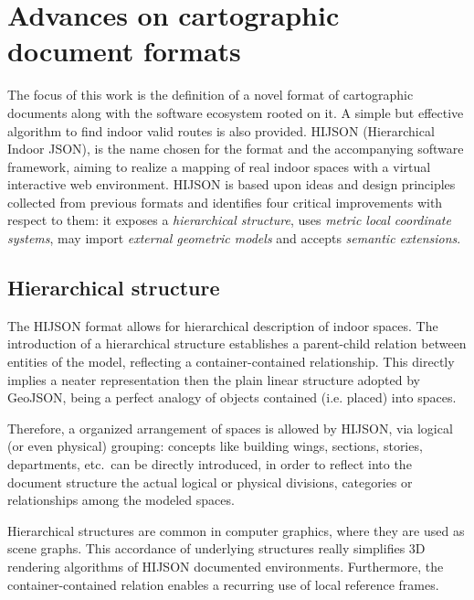 
\section{Advances on cartographic\\ document formats}\label{advances-on-cartographic-document-format}
\label{advances}

The focus of this work is the definition of a novel format of cartographic
documents along with the software ecosystem rooted on it. A simple but
effective algorithm to find indoor valid routes is also provided.  {HIJSON}
({H}ierarchical {I}ndoor {JSON}),  is the name chosen
for the format and the accompanying software framework, aiming to realize a
mapping of real indoor spaces with a virtual interactive web environment.
HIJSON is based upon ideas and design principles collected from previous
formats and identifies four critical improvements with respect to them: it
exposes a \emph{hierarchical structure}, uses \emph{metric local coordinate
systems}, may import \emph{external geometric models} and accepts \emph{semantic
extensions}. 

\subsection{Hierarchical structure}\label{hierarchical-structure}

The HIJSON format allows for hierarchical description of indoor spaces. The
introduction of a hierarchical structure establishes a parent-child relation
between entities of the model, reflecting a container-contained relationship.
This directly implies a neater representation then the plain linear structure
adopted by GeoJSON, being a perfect analogy of objects contained (i.e.
placed) into spaces.

Therefore, a  organized arrangement of spaces is allowed by HIJSON, via
logical (or even physical) grouping: concepts like building wings, sections,
stories, departments, etc.~can be directly introduced, in order to reflect
into the document structure the actual logical or physical divisions,
categories or relationships among the modeled spaces.

Hierarchical structures are common in computer graphics, where they are used
as scene graphs. This accordance of underlying structures really simplifies 3D
rendering algorithms of HIJSON documented environments. Furthermore, the
container-contained relation enables a recurring use of local reference
frames.

